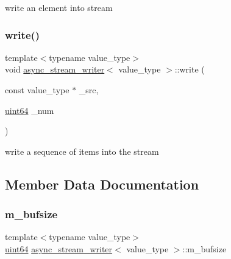 write an element into stream 

\mbox{\label{classasync__stream__writer_a95a073a12efffbb4d0f1417abef06ab3}} 
\subsubsection{\texorpdfstring{write()}{write()}\hspace{0.1cm}{\footnotesize\ttfamily [2/2]}}
{\footnotesize\ttfamily template$<$typename value\+\_\+type$>$ \\
void \hyperlink{classasync__stream__writer}{async\+\_\+stream\+\_\+writer}$<$ value\+\_\+type $>$\+::write (\begin{DoxyParamCaption}\item[{const value\+\_\+type $\ast$}]{\+\_\+src,  }\item[{\hyperlink{types_8h_a60e8696a4678cd348e991a1f172e53f7}{uint64}}]{\+\_\+num }\end{DoxyParamCaption})\hspace{0.3cm}{\ttfamily [inline]}}



write a sequence of items into the stream 



\subsection{Member Data Documentation}
\mbox{\label{classasync__stream__writer_aea362e479496cec38f62cfe60402a390}} 
\subsubsection{\texorpdfstring{m\+\_\+bufsize}{m\_bufsize}}
{\footnotesize\ttfamily template$<$typename value\+\_\+type$>$ \\
\hyperlink{types_8h_a60e8696a4678cd348e991a1f172e53f7}{uint64} \hyperlink{classasync__stream__writer}{async\+\_\+stream\+\_\+writer}$<$ value\+\_\+type $>$\+::m\+\_\+bufsize\hspace{0.3cm}{\ttfamily [private]}}



